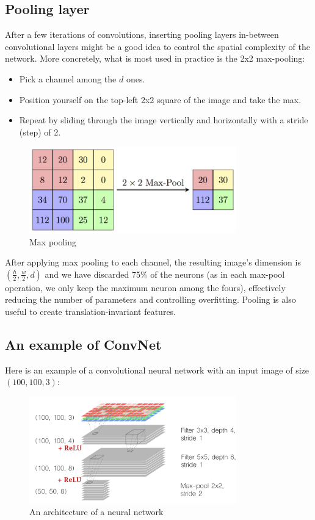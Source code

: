 \subsection{Pooling layer}
After a few iterations of convolutions, inserting pooling layers in-between convolutional layers might be a good idea to control the spatial complexity of the network. More concretely, what is most used in practice is the 2x2 max-pooling:
\begin{itemize}
\item Pick a channel among the $d$ ones.
\item Position yourself on the top-left 2x2 square of the image and take the max.
\item Repeat by sliding through the image vertically and horizontally with a stride (step) of 2.
\end{itemize}

\begin{figure}
\centering
\includegraphics[width=0.8\textwidth]{Images/maxpool.png}
\caption{Max pooling \cite{camb-spark}}
\end{figure}

After applying max pooling to each channel, the resulting image's dimension is $(\frac{h}{2}, \frac{w}{2}, d)$ and we have discarded 75\% of the neurons (as in each max-pool operation, we only keep the maximum neuron among the fours), effectively reducing the number of parameters and controlling overfitting. Pooling is also useful to create translation-invariant features.

\subsection{An example of ConvNet}
Here is an example of a convolutional neural network with an input image of size $(100, 100, 3)$:

\begin{figure}[H]
\centering
\includegraphics[width=0.8\textwidth]{Images/conv_archi.png}
\caption{An architecture of a neural network \cite{gorner}}
\end{figure}

